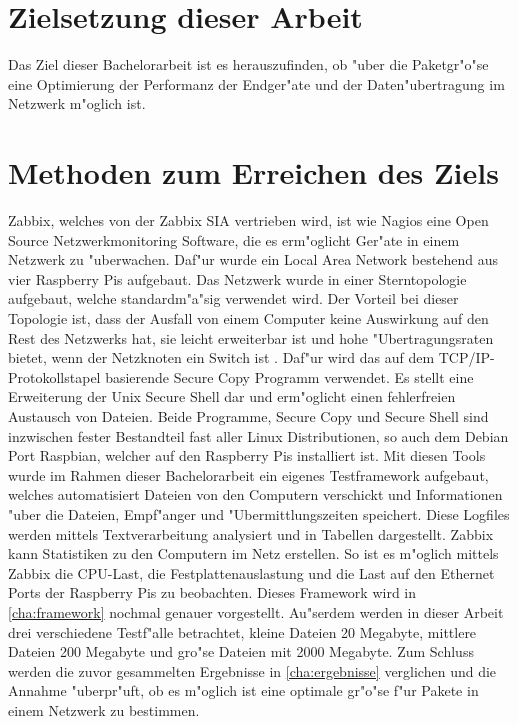 \section{Zielsetzung dieser Arbeit}
Das Ziel dieser Bachelorarbeit ist es herauszufinden, ob "uber die Paketgr"o"se eine %
Optimierung der Performanz der Endger"ate und der Daten"ubertragung im Netzwerk m"oglich %
ist.  


\section{Methoden zum Erreichen des Ziels}

Zabbix, welches von der Zabbix SIA vertrieben wird, ist wie Nagios eine Open Source %
Netzwerkmonitoring Software, die es erm"oglicht Ger"ate in einem Netzwerk zu "uberwachen. %
Daf"ur wurde ein Local Area Network bestehend aus vier Raspberry Pis aufgebaut. Das Netzwerk wurde %
in einer Sterntopologie aufgebaut, welche standardm"a"sig verwendet wird. Der Vorteil bei dieser Topologie ist, dass %
der Ausfall von einem Computer keine Auswirkung auf den Rest des Netzwerks hat, sie leicht erweiterbar ist und %
hohe "Ubertragungsraten bietet, wenn der Netzknoten ein Switch ist \autocite{book:CN2003}. %
Daf"ur wird das auf dem TCP/IP-Protokollstapel basierende Secure Copy Programm verwendet. %
Es stellt eine Erweiterung der Unix Secure Shell dar und erm"oglicht einen fehlerfreien %
Austausch von Dateien. Beide Programme, Secure Copy und Secure Shell sind inzwischen fester Bestandteil %
fast aller Linux Distributionen, so auch dem Debian Port Raspbian, welcher auf den %
Raspberry Pis installiert ist. Mit diesen Tools wurde im Rahmen dieser Bachelorarbeit ein eigenes Testframework aufgebaut, %
welches automatisiert Dateien von den Computern verschickt und Informationen "uber die Dateien, %
Empf"anger und "Ubermittlungszeiten speichert. Diese Logfiles werden %
mittels Textverarbeitung analysiert und in Tabellen dargestellt. Zabbix kann %
Statistiken zu den Computern im Netz erstellen. So ist es m"oglich mittels Zabbix die %
CPU-Last, die Festplattenauslastung und die Last auf den Ethernet Ports der Raspberry Pis %
zu beobachten. Dieses Framework wird in \cref{cha:framework} nochmal genauer vorgestellt. %
Au"serdem werden in dieser Arbeit %
drei verschiedene Testf"alle betrachtet, kleine Dateien 20 Megabyte, %
mittlere Dateien 200 Megabyte und gro"se Dateien mit 2000 Megabyte. %
Zum Schluss werden die zuvor gesammelten Ergebnisse in \cref{cha:ergebnisse} verglichen und die %
Annahme "uberpr"uft, ob es m"oglich ist eine optimale gr"o"se f"ur Pakete in einem Netzwerk %
zu bestimmen. %







